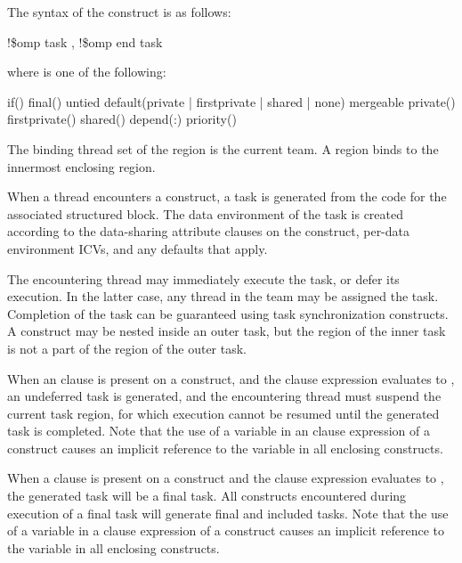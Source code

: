 \fortranspecificstart
The syntax of the  construct is as follows: 

\begin{boxedcode}
!\$omp task \plc{[clause[ [},\plc{] clause] ... ]}
!\$omp end task
\end{boxedcode}

where  is one of the following:

\begin{indentedcodelist}
if()
final()
untied
default(private \textnormal{|} firstprivate \textnormal{|} shared \textnormal{|} none)
mergeable
private()
firstprivate()
shared()
depend(:)
priority()
\end{indentedcodelist}
\fortranspecificend

\binding
The binding thread set of the  region is the current team. A  region binds to 
the innermost enclosing  region. 

\descr
When a thread encounters a  construct, a task is generated from the code for the 
associated structured block. The data environment of the task is created according to the 
data-sharing attribute clauses on the  construct, per-data environment ICVs, and 
any defaults that apply.

The encountering thread may immediately execute the task, or defer its execution. In the 
latter case, any thread in the team may be assigned the task. Completion of the task can 
be guaranteed using task synchronization constructs. A  construct may be nested 
inside an outer task, but the  region of the inner task is not a part of the  
region of the outer task.

When an  clause is present on a  construct, and the  clause expression 
evaluates to , an undeferred task is generated, and the encountering thread must 
suspend the current task region, for which execution cannot be resumed until the 
generated task is completed. Note that the use of a variable in an  clause expression 
of a  construct causes an implicit reference to the variable in all enclosing 
constructs.

When a  clause is present on a  construct and the  clause expression 
evaluates to , the generated task will be a final task. All  constructs 
encountered during execution of a final task will generate final and included tasks. Note 
that the use of a variable in a  clause expression of a  construct causes an 
implicit reference to the variable in all enclosing constructs.

